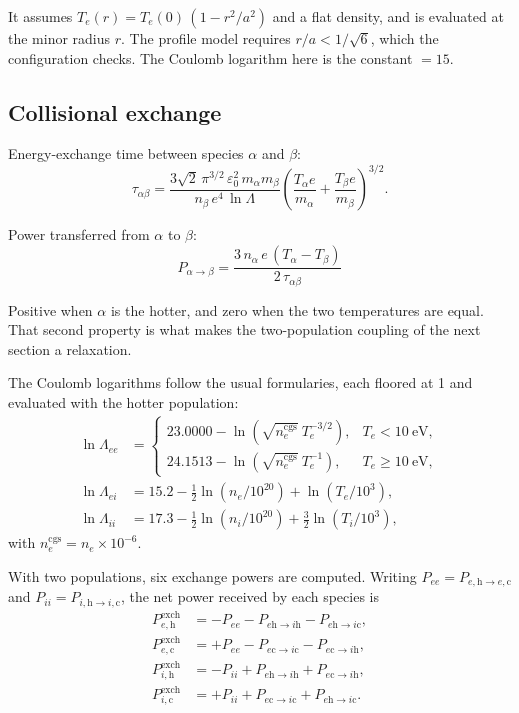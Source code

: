 \documentclass[11pt,a4paper]{article}
\newcommand{\h}{\mathrm{h}}
\newcommand{\co}{\mathrm{c}}
\begin{document}
It assumes $T_e(r) = T_e(0)\,(1 - r^2/a^2)$ and a flat density, and is evaluated at the minor
radius $r$. The profile model requires $r/a < 1/\sqrt{6}$, which the configuration checks. The
Coulomb logarithm here is the constant  $= 15$.

\subsection*{Collisional exchange}

Energy-exchange time between species $\alpha$ and $\beta$:
\begin{equation}
  \tau_{\alpha\beta} = \frac{3\sqrt{2}\, \pi^{3/2}\, \varepsilon_0^2\, m_\alpha m_\beta}
                            {n_\beta\, e^4\, \ln\Lambda}
    \left( \frac{T_\alpha e}{m_\alpha} + \frac{T_\beta e}{m_\beta} \right)^{3/2} .
\end{equation}

Power transferred from $\alpha$ to $\beta$:
\begin{equation}
\boxed{\;
  P_{\alpha \to \beta} = \frac{3\, n_\alpha\, e\, \left(T_\alpha - T_\beta\right)}
                              {2\, \tau_{\alpha\beta}} \;}
\end{equation}

Positive when $\alpha$ is the hotter, and zero when the two temperatures are equal. That second
property is what makes the two-population coupling of the next section a relaxation.

The Coulomb logarithms follow the usual formularies, each floored at 1 and evaluated with the
hotter population:
\begin{align}
  \ln\Lambda_{ee} &= \begin{cases}
      23.0000 - \ln\!\left( \sqrt{n_e^{\mathrm{cgs}}}\ T_e^{-3/2} \right), & T_e < 10\ \mathrm{eV}, \\
      24.1513 - \ln\!\left( \sqrt{n_e^{\mathrm{cgs}}}\ T_e^{-1} \right),   & T_e \geq 10\ \mathrm{eV},
    \end{cases} \\
  \ln\Lambda_{ei} &= 15.2 - \tfrac{1}{2}\ln\!\left(n_e / 10^{20}\right) + \ln\!\left(T_e / 10^{3}\right), \\
  \ln\Lambda_{ii} &= 17.3 - \tfrac{1}{2}\ln\!\left(n_i / 10^{20}\right) + \tfrac{3}{2}\ln\!\left(T_i / 10^{3}\right),
\end{align}
with $n_e^{\mathrm{cgs}} = n_e \times 10^{-6}$.

With two populations, six exchange powers are computed. Writing
$P_{ee} = P_{e,\h \to e,\co}$ and $P_{ii} = P_{i,\h \to i,\co}$, the net power received by each
species is
\begin{align}
  P^{\mathrm{exch}}_{e,\h}  &= -P_{ee} - P_{e\h \to i\h} - P_{e\h \to i\co} , \\
  P^{\mathrm{exch}}_{e,\co} &= +P_{ee} - P_{e\co \to i\co} - P_{e\co \to i\h} , \\
  P^{\mathrm{exch}}_{i,\h}  &= -P_{ii} + P_{e\h \to i\h} + P_{e\co \to i\h} , \\
  P^{\mathrm{exch}}_{i,\co} &= +P_{ii} + P_{e\co \to i\co} + P_{e\h \to i\co} .
\end{align}
\end{document}
